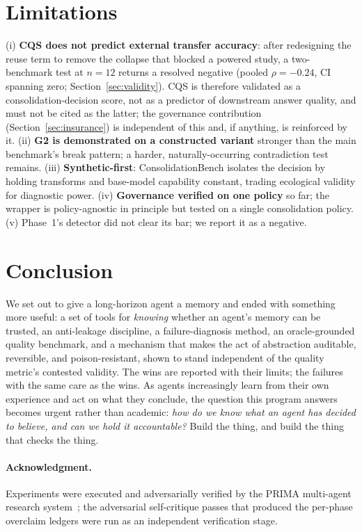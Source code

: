 \documentclass[11pt]{article}
\newcommand{\bench}{ConsolidationBench}
\newcommand{\cqs}{\textsc{CQS}}
\begin{document}
\section{Limitations}
(i) \textbf{\cqs{} does not predict external transfer accuracy}: after redesigning the
reuse term to remove the collapse that blocked a powered study, a two-benchmark test at
$n{=}12$ returns a resolved negative (pooled $\rho = -0.24$, CI spanning zero;
Section~\ref{sec:validity}). \cqs{} is therefore validated as a consolidation-decision
score, not as a predictor of downstream answer quality, and must not be cited as the
latter; the governance contribution (Section~\ref{sec:insurance}) is independent of this
and, if anything, is reinforced by it. (ii) \textbf{G2 is demonstrated on a constructed variant}
stronger than the main benchmark's break pattern; a harder, naturally-occurring
contradiction test remains. (iii) \textbf{Synthetic-first}: \bench{} isolates the
decision by holding transforms and base-model capability constant, trading ecological
validity for diagnostic power. (iv) \textbf{Governance verified on one policy} so
far; the wrapper is policy-agnostic in principle but tested on a single consolidation
policy. (v) Phase~1's detector did not clear its bar; we report it as a negative.

\section{Conclusion}
We set out to give a long-horizon agent a memory and ended with something more useful:
a set of tools for \emph{knowing} whether an agent's memory can be trusted, an
anti-leakage discipline, a failure-diagnosis method, an oracle-grounded quality
benchmark, and a mechanism that makes the act of abstraction auditable, reversible,
and poison-resistant, shown to stand independent of the quality metric's contested
validity. The wins are reported with their limits; the failures with the same care as
the wins. As agents increasingly learn from their own experience and act on what they
conclude, the question this program answers becomes urgent rather than academic:
\emph{how do we know what an agent has decided to believe, and can we hold it
accountable?}
Build the thing, and build the thing that checks the thing.

\paragraph{Acknowledgment.} Experiments were executed and adversarially verified by
the PRIMA multi-agent research system~\cite{prima}; the adversarial self-critique
passes that produced the per-phase overclaim ledgers were run as an independent
verification stage.



\end{document}
